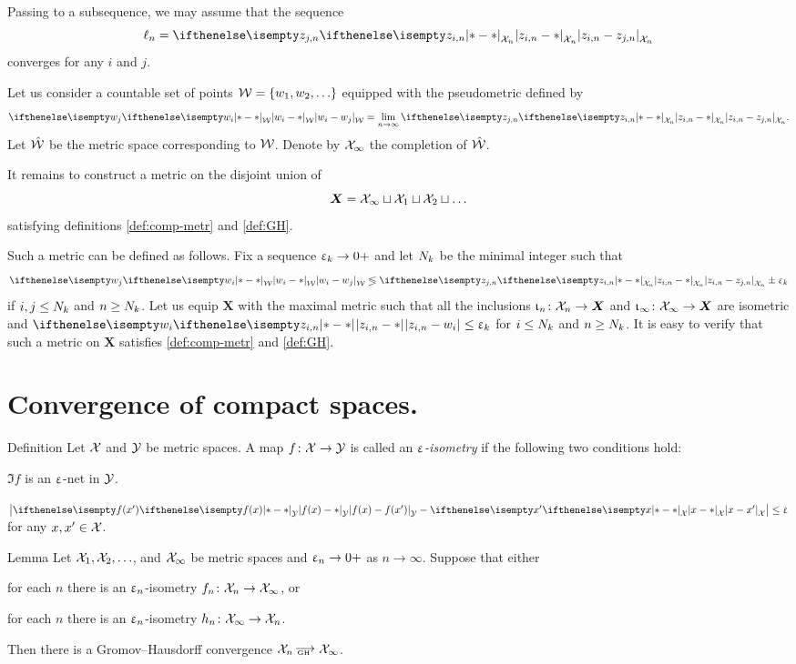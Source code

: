 Passing to a subsequence, we may assume that the sequence \[\ell_n=\dist{z_{i,n}}{z_{j,n}}{\spc{X}_n}\] 
converges for any $i$ and $j$.

Let us consider a countable set of points $\spc{W}=\{w_1,w_2,\dots\}$
equipped with the pseudometric defined by 
\[\dist{w_i}{w_j}{\spc{W}}
=
\lim_{n\to\infty}\dist{z_{i,n}}{z_{j,n}}{\spc{X}_n}.\]
Let $\hat{\mathcal{W}}$ be the metric space corresponding to $\mathcal{W}$.
Denote by
$\mathcal{X}_\infty$ the completion of $\hat{\mathcal{W}}$.

It remains to construct a metric on the disjoint union of \[\bm{X}=\spc{X}_\infty\sqcup\spc{X}_1\sqcup\spc{X}_2\sqcup\dots\] 
satisfying definitions \ref{def:comp-metr} and \ref{def:GH}.

Such a  metric can be defined as follows.
Fix a sequence $\eps_\kay\to0+$
and let $N_k$ be the minimal integer such that
\[\dist{w_i}{w_j}{\spc{W}}
\lege
\dist{z_{i,n}}{z_{j,n}}{\spc{X}_n}\pm\eps_\kay
\]
if $i,j\le N_\kay$ and $n\ge N_\kay$. 
Let us equip $\bm{X}$ with the maximal metric such that all the inclusions $\iota_n\:\spc{X}_n\to\bm X$  and $\iota_\infty\:\spc{X}_\infty\to\bm X$ are isometric and 
$
\dist{z_{i,n}}{w_i}{}\le \eps_\kay
$
for $i\le N_\kay$ and $n\ge N_\kay$.
It is easy to verify  that such a metric on $\bm X$ satisfies  \ref{def:comp-metr} and \ref{def:GH}.
\qeds

\section{Convergence of compact spaces.}

\begin{thm}{Definition}
Let $\mathcal{X}$ and $\mathcal{Y}$ be metric spaces. A map $f\:\spc{X}\to\spc{Y}$
is called an \emph{$\upvarepsilon$-isometry}
if the following two conditions hold:
\begin{subthm}{}
$\Im f$ is an $\upvarepsilon$-net in $\mathcal{Y}$.
\end{subthm}

\begin{subthm}{}
$\bigl|\dist{f(x)}{f(x')}{\spc{Y}}-\dist{x}{x'}{\spc{X}}\bigr|\le \eps$ for any $x,x'\in\spc{X}$.
\end{subthm}

\end{thm}

\begin{thm}{Lemma}\label{lem:almost-isom}
Let $\spc{X}_1,\spc{X}_2,\dots$, and  $\mathcal{X}_\infty$ be metric spaces and $\eps_n\to\0+$ as $n\to\infty$.
Suppose that either 

\begin{subthm}{}\label{lem:almost-isom-a}
for each $n$ there is an $\upvarepsilon_n$-isometry $f_n\:\spc{X}_n\to\spc{X}_\infty$, or
\end{subthm}

\begin{subthm}{}\label{lem:almost-isom-b}
for each $n$ there is an $\upvarepsilon_n$-isometry $h_n\:\spc{X}_\infty\to\spc{X}_n$.
\end{subthm}

Then there is a Gromov--Hausdorff convergence $\spc{X}_n\GHto \spc{X}_\infty$.
\end{thm}



